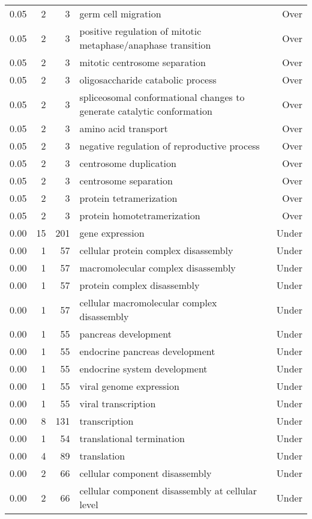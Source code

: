 \begin{longtable}{rrrp{7cm}r}
  0.05 &   2 &   3 & germ cell migration & Over \\ 
  0.05 &   2 &   3 & positive regulation of mitotic metaphase/anaphase transition & Over \\ 
  0.05 &   2 &   3 & mitotic centrosome separation & Over \\ 
  0.05 &   2 &   3 & oligosaccharide catabolic process & Over \\ 
  0.05 &   2 &   3 & spliceosomal conformational changes to generate catalytic conformation & Over \\ 
  0.05 &   2 &   3 & amino acid transport & Over \\ 
  0.05 &   2 &   3 & negative regulation of reproductive process & Over \\ 
  0.05 &   2 &   3 & centrosome duplication & Over \\ 
  0.05 &   2 &   3 & centrosome separation & Over \\ 
  0.05 &   2 &   3 & protein tetramerization & Over \\ 
  0.05 &   2 &   3 & protein homotetramerization & Over \\ 
  0.00 &  15 & 201 & gene expression & Under \\ 
  0.00 &   1 &  57 & cellular protein complex disassembly & Under \\ 
  0.00 &   1 &  57 & macromolecular complex disassembly & Under \\ 
  0.00 &   1 &  57 & protein complex disassembly & Under \\ 
  0.00 &   1 &  57 & cellular macromolecular complex disassembly & Under \\ 
  0.00 &   1 &  55 & pancreas development & Under \\ 
  0.00 &   1 &  55 & endocrine pancreas development & Under \\ 
  0.00 &   1 &  55 & endocrine system development & Under \\ 
  0.00 &   1 &  55 & viral genome expression & Under \\ 
  0.00 &   1 &  55 & viral transcription & Under \\ 
  0.00 &   8 & 131 & transcription & Under \\ 
  0.00 &   1 &  54 & translational termination & Under \\ 
  0.00 &   4 &  89 & translation & Under \\ 
  0.00 &   2 &  66 & cellular component disassembly & Under \\ 
  0.00 &   2 &  66 & cellular component disassembly at cellular level & Under \\ 

\end{longtable}
